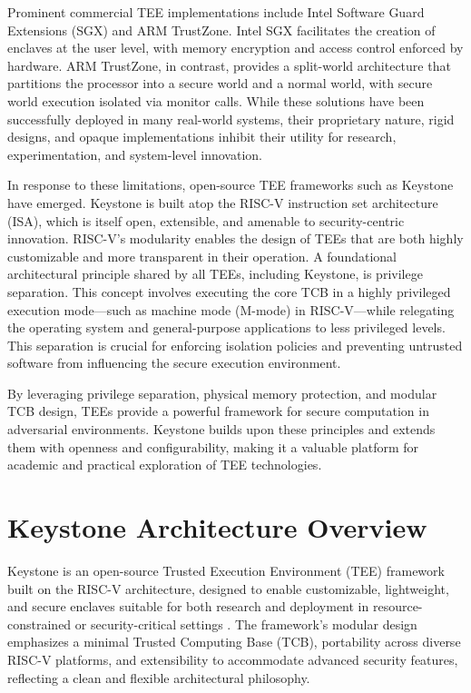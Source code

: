 Prominent commercial TEE implementations include Intel Software Guard Extensions (SGX) and ARM TrustZone. Intel SGX facilitates the creation of enclaves at the user level, with memory encryption and access control enforced by hardware. ARM TrustZone, in contrast, provides a split-world architecture that partitions the processor into a secure world and a normal world, with secure world execution isolated via monitor calls. While these solutions have been successfully deployed in many real-world systems, their proprietary nature, rigid designs, and opaque implementations inhibit their utility for research, experimentation, and system-level innovation.

In response to these limitations, open-source TEE frameworks such as Keystone have emerged. Keystone is built atop the RISC-V instruction set architecture (ISA), which is itself open, extensible, and amenable to security-centric innovation. RISC-V’s modularity enables the design of TEEs that are both highly customizable and more transparent in their operation. A foundational architectural principle shared by all TEEs, including Keystone, is privilege separation. This concept involves executing the core TCB in a highly privileged execution mode—such as machine mode (M-mode) in RISC-V—while relegating the operating system and general-purpose applications to less privileged levels. This separation is crucial for enforcing isolation policies and preventing untrusted software from influencing the secure execution environment.

By leveraging privilege separation, physical memory protection, and modular TCB design, TEEs provide a powerful framework for secure computation in adversarial environments. Keystone builds upon these principles and extends them with openness and configurability, making it a valuable platform for academic and practical exploration of TEE technologies.

\section{Keystone Architecture Overview}

Keystone is an open-source Trusted Execution Environment (TEE) framework built on the RISC-V architecture, designed to enable customizable, lightweight, and secure enclaves suitable for both research and deployment in resource-constrained or security-critical settings \cite{dayeol2019keystone}. The framework’s modular design emphasizes a minimal Trusted Computing Base (TCB), portability across diverse RISC-V platforms, and extensibility to accommodate advanced security features, reflecting a clean and flexible architectural philosophy.

